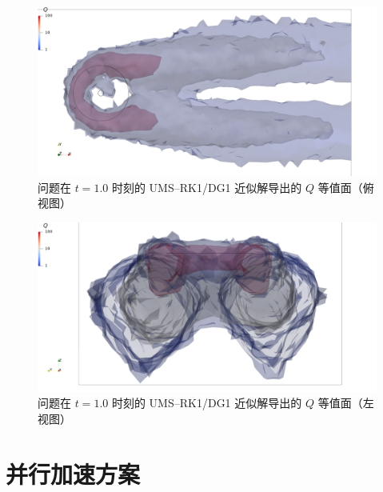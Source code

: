 \begin{figure}[h!]
\begin{centering}
\includegraphics[width=1\textwidth,height=0.26\textheight,keepaspectratio]{figures/forward/p=1/Q_z-}
\par\end{centering}
\caption{\label{fig:forward_Q_z_view}问题在
$t=1.0$ 时刻的 UMS–RK1/DG1 近似解导出的 $Q$ 等值面（俯视图）}
\end{figure}

\begin{figure}[h!]
\begin{centering}
\includegraphics[width=1\textwidth,height=0.26\textheight,keepaspectratio]{figures/forward/p=1/Q_x+}
\par\end{centering}
\caption{\label{fig:forward_Q_x_view}问题在
$t=1.0$ 时刻的 UMS–RK1/DG1 近似解导出的 $Q$ 等值面（左视图）}
\end{figure}


\section{并行加速方案\label{sec:parallel}}

